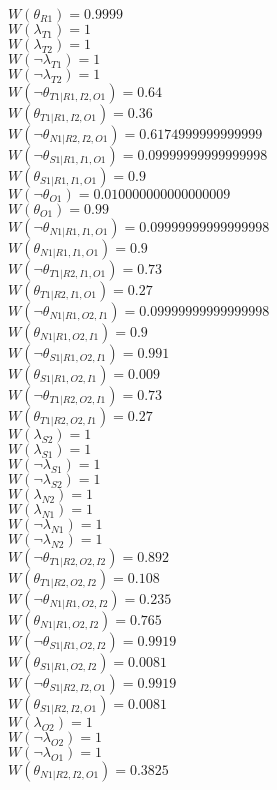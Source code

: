 $W(\theta_{R1})=0.9999$\\
$W(\lambda_{T1})=1$\\
$W(\lambda_{T2})=1$\\
$W(\neg\lambda_{T1})=1$\\
$W(\neg\lambda_{T2})=1$\\
$W(\neg\theta_{T1|R1,I2,O1})=0.64$\\
$W(\theta_{T1|R1,I2,O1})=0.36$\\
$W(\neg\theta_{N1|R2,I2,O1})=0.6174999999999999$\\
$W(\neg\theta_{S1|R1,I1,O1})=0.09999999999999998$\\
$W(\theta_{S1|R1,I1,O1})=0.9$\\
$W(\neg\theta_{O1})=0.010000000000000009$\\
$W(\theta_{O1})=0.99$\\
$W(\neg\theta_{N1|R1,I1,O1})=0.09999999999999998$\\
$W(\theta_{N1|R1,I1,O1})=0.9$\\
$W(\neg\theta_{T1|R2,I1,O1})=0.73$\\
$W(\theta_{T1|R2,I1,O1})=0.27$\\
$W(\neg\theta_{N1|R1,O2,I1})=0.09999999999999998$\\
$W(\theta_{N1|R1,O2,I1})=0.9$\\
$W(\neg\theta_{S1|R1,O2,I1})=0.991$\\
$W(\theta_{S1|R1,O2,I1})=0.009$\\
$W(\neg\theta_{T1|R2,O2,I1})=0.73$\\
$W(\theta_{T1|R2,O2,I1})=0.27$\\
$W(\lambda_{S2})=1$\\
$W(\lambda_{S1})=1$\\
$W(\neg\lambda_{S1})=1$\\
$W(\neg\lambda_{S2})=1$\\
$W(\lambda_{N2})=1$\\
$W(\lambda_{N1})=1$\\
$W(\neg\lambda_{N1})=1$\\
$W(\neg\lambda_{N2})=1$\\
$W(\neg\theta_{T1|R2,O2,I2})=0.892$\\
$W(\theta_{T1|R2,O2,I2})=0.108$\\
$W(\neg\theta_{N1|R1,O2,I2})=0.235$\\
$W(\theta_{N1|R1,O2,I2})=0.765$\\
$W(\neg\theta_{S1|R1,O2,I2})=0.9919$\\
$W(\theta_{S1|R1,O2,I2})=0.0081$\\
$W(\neg\theta_{S1|R2,I2,O1})=0.9919$\\
$W(\theta_{S1|R2,I2,O1})=0.0081$\\
$W(\lambda_{O2})=1$\\
$W(\neg\lambda_{O2})=1$\\
$W(\neg\lambda_{O1})=1$\\
$W(\theta_{N1|R2,I2,O1})=0.3825$\\
